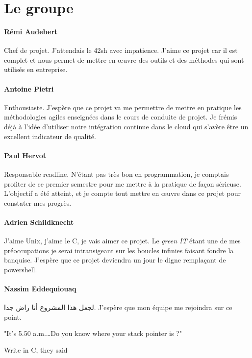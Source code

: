 \section{Le groupe}

\paragraph{Rémi Audebert} Chef de projet. J'attendais le 42sh avec impatience.
J'aime ce projet car il est complet et nous permet de mettre en œuvre des
outils et des méthodes qui sont utilisés en entreprise.

\paragraph{Antoine Pietri} Enthousiaste. J'espère que ce projet va me permettre
de mettre en pratique les méthodologies agiles enseignées dans le cours de
conduite de projet. Je frémis déjà à l'idée d'utiliser notre intégration
continue dans le cloud qui s'avère être un excellent indicateur de qualité.

\paragraph{Paul Hervot} Responsable readline. N'étant pas très bon en
programmation, je comptais profiter de ce premier semestre pour me mettre à la
pratique de façon sérieuse. L'objectif a été atteint, et je compte tout mettre
en œuvre dans ce projet pour constater mes progrès.

\paragraph{Adrien Schildknecht} J'aime Unix, j'aime le C, je vais aimer ce
projet. Le \textit{green IT} étant une de mes préoccupations je serai
intransigeant sur les boucles infinies faisant fondre la banquise.
J'espère que ce projet deviendra un jour le digne remplaçant de powershell.

\paragraph{Nassim Eddequiouaq} لجعل هذا المشروع أنا راض جدا. J’espère que mon
équipe me rejoindra sur ce point.

\epigraph{
         "It's 5.50 a.m.\ldots Do you know where your stack pointer is ?"
}{Write in C, they said}

